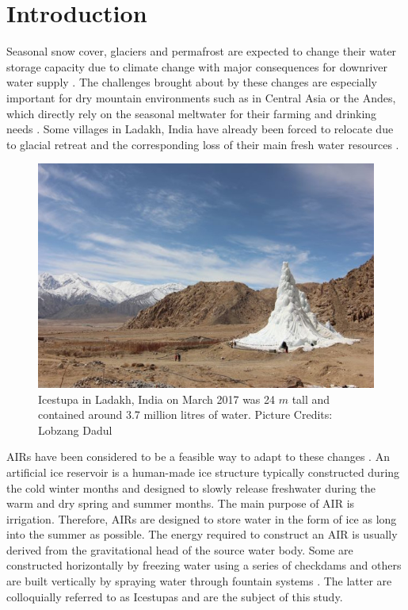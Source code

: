 \documentclass[utf8]{frontiersSCNS} %
\begin{document}
\section{Introduction}

Seasonal snow cover, glaciers and permafrost are expected to change their water storage capacity due to climate change
with major consequences for downriver water supply \citep{Immerzeel_2020}. The challenges brought about by these
changes are especially important for dry mountain environments such as in Central Asia or the Andes, which directly
rely on the seasonal meltwater for their farming and drinking needs \citep{HoelzleBarandun_2019, Apel_2018,
Buytaert_2017, Chen_2016, UNGERSHAYESTEH_2013}. Some villages in Ladakh, India have already been forced to relocate
due to glacial retreat and the corresponding loss of their main fresh water resources \citep{zanskar}. 

\begin{figure} \begin{center} \includegraphics[width=10 cm]{Figures/Figure_1.jpg}
\end{center} \caption{Icestupa in Ladakh, India on March 2017 was 24 $m$ tall and contained around 3.7 million litres
of water. Picture Credits: Lobzang Dadul} \label{fig:cone} \end{figure}

AIRs have been considered to be a feasible way to adapt to these changes \citep{IPCC_2019,
10.1659/MRD-JOURNAL-D-18-00072.1}. An artificial ice reservoir is a human-made ice structure typically constructed
during the cold winter months and designed to slowly release freshwater during the warm and dry spring and summer
months. The main purpose of AIR is irrigation. Therefore, AIRs are designed to store water in the form of ice as long
into the summer as possible. The energy required to construct an AIR is usually derived from the gravitational head of
the source water body. Some are constructed horizontally by freezing water using a series of checkdams and others are
built vertically by spraying water through fountain systems \citep{Nusser_2018}. The latter are colloquially referred
to as Icestupas and are the subject of this study.
\end{document}
